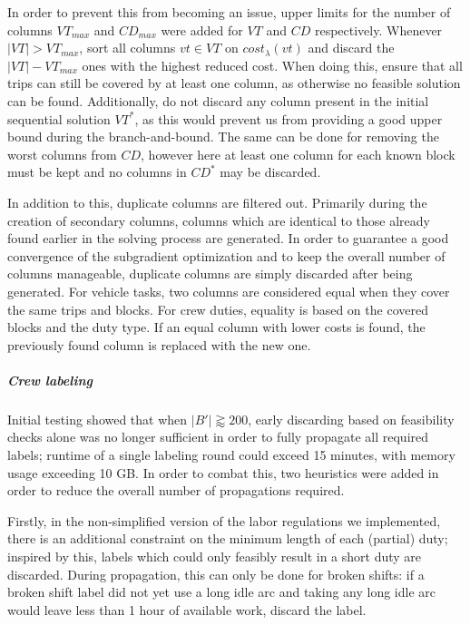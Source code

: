 \documentclass[]{article}
\begin{document}
In order to prevent this from becoming an issue, upper limits for the number of columns $VT_{max}$ and $CD_{max}$ were added for $VT$ and $CD$ respectively. Whenever $|VT| > VT_{max}$, sort all columns $vt \in VT$ on $cost_\lambda(vt)$ and discard the $|VT| - VT_{max}$ ones with the highest reduced cost. When doing this, ensure that all trips can still be covered by at least one column, as otherwise no feasible solution can be found. Additionally, do not discard any column present in the initial sequential solution $VT^*$, as this would prevent us from providing a good upper bound during the branch-and-bound. The same can be done for removing the worst columns from $CD$, however here at least one column for each known block must be kept and no columns in $CD^*$ may be discarded.

In addition to this, duplicate columns are filtered out. Primarily during the creation of secondary columns, columns which are identical to those already found earlier in the solving process are generated. In order to guarantee a good convergence of the subgradient optimization and to keep the overall number of columns manageable, duplicate columns are simply discarded after being generated. For vehicle tasks, two columns are considered equal when they cover the same trips and blocks. For crew duties, equality is based on the covered blocks and the duty type. If an equal column with lower costs is found, the previously found column is replaced with the new one.

\subparagraph{Crew labeling} Initial testing showed that when $|B'| \gtrapprox 200$, early discarding based on feasibility checks alone was no longer sufficient in order to fully propagate all required labels; runtime of a single labeling round could exceed 15 minutes, with memory usage exceeding 10 GB. In order to combat this, two heuristics were added in order to reduce the overall number of propagations required.

Firstly, in the non-simplified version of the labor regulations we implemented, there is an additional constraint on the minimum length of each (partial) duty; inspired by this, labels which could only feasibly result in a short duty are discarded. During propagation, this can only be done for broken shifts: if a broken shift label did not yet use a long idle arc and taking any long idle arc would leave less than 1 hour of available work, discard the label.
\end{document}
